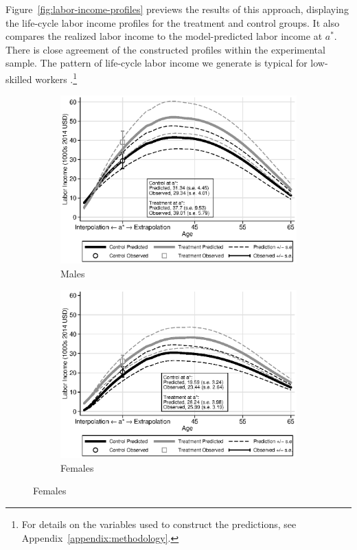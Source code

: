 Figure~\ref{fig:labor-income-profiles} previews the results of this approach, displaying the life-cycle labor income profiles for the treatment and control groups. It also compares the realized labor income to the model-predicted labor income at $a^*$. There is close agreement of the constructed profiles within the experimental sample. The pattern of life-cycle labor income we generate is typical for low-skilled workers \citep{Blundell-etal_2015_J-Pub-E,Gladden_Taber_2000_WageProgression,Sanders-Taber_2012_AR,Lagakos_Moll_etal_2016_LifeCycle_NBER}.\footnote{For details on the variables used to construct the predictions, see  Appendix~\ref{appendix:methodology}.}

\begin{figure}
\centering
\caption{Predicted Labor Income Profiles for ABC/CARE Participants}\label{fig:labor-income-profiles}
\begin{subfigure}[h]{0.5\textwidth}
		\centering
		\caption{Males} \label{fig:labor-income-profilesc}
		\includegraphics[width=\textwidth]{output/labor_25-65_pset1_mset1_male.eps}
\end{subfigure}%
\begin{subfigure}[h]{0.5\textwidth}
		\centering
		\caption{Females} \label{fig:labor-income-profilesa}
		\includegraphics[width=\textwidth]{output/labor_25-65_pset1_mset1_female.eps}

\end{subfigure}
\end{figure}

